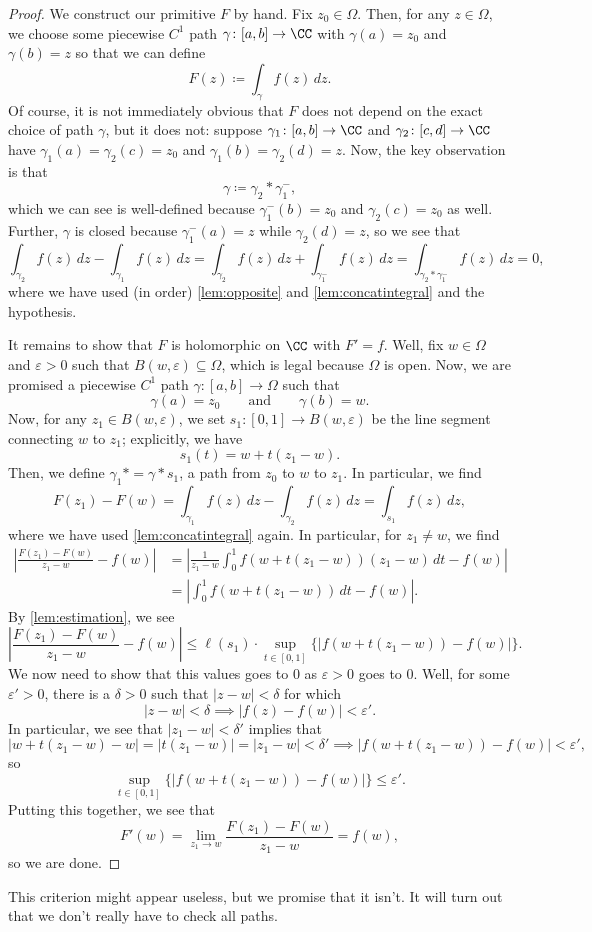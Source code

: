 \documentclass[../notes.tex]{subfiles}
\begin{document}
\begin{proof}
	We construct our primitive $F$ by hand. Fix $z_0\in\Omega$. Then, for any $z\in\Omega$, we choose some piecewise $C^1$ path $\gamma\colon [a,b]\to\CC$ with $\gamma(a)=z_0$ and $\gamma(b)=z$ so that we can define
	\[F(z)\coloneqq \int_\gamma f(z)\,dz.\]
	Of course, it is not immediately obvious that $F$ does not depend on the exact choice of path $\gamma$, but it does not: suppose $\gamma_1\colon [a,b]\to\CC$ and $\gamma_2\colon [c,d]\to\CC$ have $\gamma_1(a)=\gamma_2(c)=z_0$ and $\gamma_1(b)=\gamma_2(d)=z$. Now, the key observation is that
	\[\gamma\coloneqq \gamma_2*\gamma_1^-,\]
	which we can see is well-defined because $\gamma_1^-(b)=z_0$ and $\gamma_2(c)=z_0$ as well. Further, $\gamma$ is closed because $\gamma_1^-(a)=z$ while $\gamma_2(d)=z$, so we see that
	\[\int_{\gamma_2}f(z)\,dz-\int_{\gamma_1}f(z)\,dz=\int_{\gamma_2}f(z)\,dz+\int_{\gamma_1^-}f(z)\,dz=\int_{\gamma_2*\gamma_1^-}f(z)\,dz=0,\]
	where we have used (in order) \autoref{lem:opposite} and \autoref{lem:concatintegral} and the hypothesis.

	It remains to show that $F$ is holomorphic on $\CC$ with $F'=f$. Well, fix $w\in\Omega$ and $\varepsilon>0$ such that $B(w,\varepsilon)\subseteq\Omega$, which is legal because $\Omega$ is open. Now, we are promised a piecewise $C^1$ path $\gamma\colon [a,b]\to\Omega$ such that
	\[\gamma(a)=z_0\qquad\text{and}\qquad\gamma(b)=w.\]
	Now, for any $z_1\in B(w,\varepsilon)$, we set $s_1\colon [0,1]\to B(w,\varepsilon)$ be the line segment connecting $w$ to $z_1$; explicitly, we have
	\[s_1(t)=w+t(z_1-w).\]
	Then, we define $\gamma_1*=\gamma*s_1$, a path from $z_0$ to $w$ to $z_1$. In particular, we find
	\[F(z_1)-F(w)=\int_{\gamma_1}f(z)\,dz-\int_{\gamma_2}f(z)\,dz=\int_{s_1}f(z)\,dz,\]
	where we have used \autoref{lem:concatintegral} again. In particular, for $z_1\ne w$, we find
	\begin{align*}
		\left|\frac{F(z_1)-F(w)}{z_1-w}-f(w)\right| &= \left|\frac1{z_1-w}\int_0^1f(w+t(z_1-w))(z_1-w)\,dt-f(w)\right| \\
		&= \left|\int_0^1f(w+t(z_1-w))\,dt-f(w)\right|.
	\end{align*}
	By \autoref{lem:estimation}, we see
	\[\left|\frac{F(z_1)-F(w)}{z_1-w}-f(w)\right|\le\ell(s_1)\cdot\sup_{t\in[0,1]}\{|f(w+t(z_1-w))-f(w)|\}.\]
	We now need to show that this values goes to $0$ as $\varepsilon>0$ goes to $0$. Well, for some $\varepsilon'>0$, there is a $\delta>0$ such that $|z-w|<\delta$ for which
	\[|z-w|<\delta\implies|f(z)-f(w)|<\varepsilon'.\]
	In particular, we see that $|z_1-w|<\delta'$ implies that
	\[|w+t(z_1-w)-w|=|t(z_1-w)|=|z_1-w|<\delta'\implies|f(w+t(z_1-w))-f(w)|<\varepsilon',\]
	so
	\[\sup_{t\in[0,1]}\{|f(w+t(z_1-w))-f(w)|\}\le\varepsilon'.\]
	Putting this together, we see that
	\[F'(w)=\lim_{z_1\to w}\frac{F(z_1)-F(w)}{z_1-w}=f(w),\]
	so we are done.
\end{proof}
\begin{remark}
	This criterion might appear useless, but we promise that it isn't. It will turn out that we don't really have to check all paths.
\end{remark}
\end{document}
